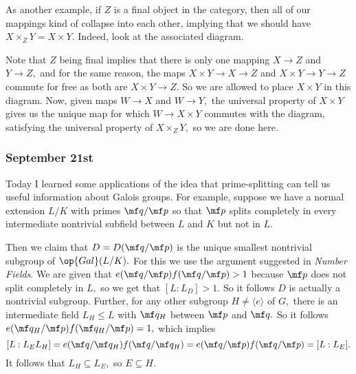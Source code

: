 As another example, if $Z$ is a final object in the category, then all of our mappings kind of collapse into each other, implying that we should have $X\times_ZY=X\times Y.$ Indeed, look at the associated diagram.
\begin{center}
\end{center}
Note that $Z$ being final implies that there is only one mapping $X\to Z$ and $Y\to Z,$ and for the same reason, the maps $X\times Y\to X\to Z$ and $X\times Y\to Y\to Z$ commute for free as both are $X\times Y\to Z.$ So we are allowed to place $X\times Y$ in this diagram. Now, given maps $W\to X$ and $W\to Y,$ the universal property of $X\times Y$ gives us the unique map for which $W\to X\times Y$ commutes with the diagram, satisfying the universal property of $X\times_ZY,$ so we are done here.

\subsubsection{September 21st}
Today I learned some applications of the idea that prime-splitting can tell us useful information about Galois groups. For example, suppose we have a normal extension $L/K$ with primes $\mf q/\mf p$ so that $\mf p$ splits completely in every intermediate nontrivial subfield between $L$ and $K$ but not in $L.$

Then we claim that $D=D(\mf q/\mf p)$ is the unique smallest nontrivial subgroup of $\op{Gal}(L/K).$ For this we use the argument suggested in \textit{Number Fields}. We are given that $e(\mf q/\mf p)f(\mf q/\mf p)>1$ because $\mf p$ does not split completely in $L,$ so we get that $[L:L_D]>1.$ So it follows $D$ is actually a nontrivial subgroup. Further, for any other subgroup $H\ne\langle e\rangle$ of $G,$ there is an intermediate field $L_H\le L$ with $\mf q_H$ between $\mf p$ and $\mf q.$ So it follows $e(\mf q_H/\mf p)f(\mf q_H/\mf p)=1,$ which implies
\[[L:L_EL_H]=e(\mf q/\mf q_H)f(\mf q/\mf q_H)=e(\mf q/\mf p)f(\mf q/\mf p)=[L:L_E].\]
It follows that $L_H\subseteq L_E,$ so $E\subseteq H.$

